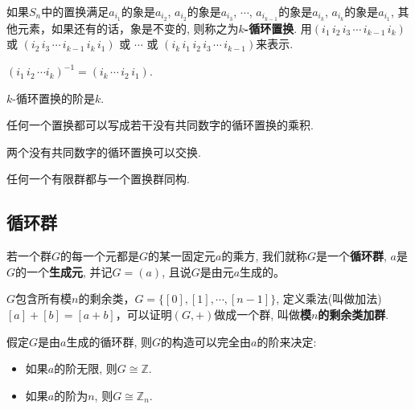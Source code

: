 \begin{Definition}[$k$-循环置换]
如果$S_n$中的置换满足$a_{i_1}$的象是$a_{i_2}$, $a_{i_2}$的象是$a_{i_3}$, $\cdots$, 
$a_{i_{k-1}}$的象是$a_{i_k}$, $a_{i_{k}}$的象是$a_{i_1}$, 其他元素，如果还有的话，象是不变的, 则称之为\textbf{$k$-循环置换}.
用$(i_1 \, i_2 \, i_3 \, \cdots \, i_{k-1} \, i_k)$ 或 
$(i_2 \, i_3 \, \cdots \, i_{k-1} \, i_k \, i_1)$ 或 $\cdots$ 或   
$( i_k \, i_1 \, i_2 \, i_3 \, \cdots \, i_{k-1})$来表示.
\end{Definition}

\begin{Proposition}
$(i_1 \, i_2 \, \cdots i_k)^{-1} = (i_k \, \cdots \, i_2 \, i_1)$.
\end{Proposition}

\begin{Proposition}
$k$-循环置换的阶是$k$.
\end{Proposition}

\begin{Proposition}
任何一个置换都可以写成若干没有共同数字的循环置换的乘积.
\end{Proposition}

\begin{Proposition}
两个没有共同数字的循环置换可以交换.
\end{Proposition}

\begin{Proposition}
任何一个有限群都与一个置换群同构.
\end{Proposition}

\subsection{循环群}

\begin{Definition}[循环群]
若一个群$G$的每一个元都是$G$的某一固定元$a$的乘方, 我们就称$G$是一个\textbf{循环群}, $a$是$G$的一个\textbf{生成元}, 并记$G = (a)$, 且说$G$是由元$a$生成的。
\end{Definition}

\begin{Definition}
$G$包含所有模$n$的剩余类，$G = \{ [0], [1], \cdots, [n-1] \}$, 定义乘法(叫做加法) $[a] + [b] = [a +b]$，可以证明$(G, +)$做成一个群, 叫做\textbf{模$n$的剩余类加群}.
\end{Definition}

\begin{Theorem}
假定$G$是由$a$生成的循环群, 则$G$的构造可以完全由$a$的阶来决定:
\begin{itemize}
\item 如果$a$的阶无限, 则$G \cong \mathbb{Z}$.
\item 如果$a$的阶为$n$, 则$G \cong \mathbb{Z}_n$.
\end{itemize}
\end{Theorem}

